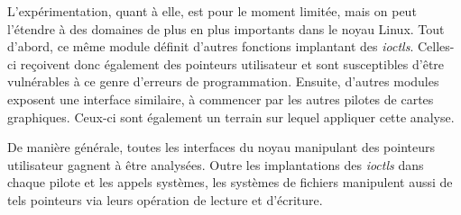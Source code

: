 
L'expérimentation, quant à elle, est pour le moment limitée, mais on peut
l'étendre à des domaines de plus en plus importants dans le noyau Linux. Tout
d'abord, ce même module définit d'autres fonctions implantant des \emph{ioctls}.
Celles-ci reçoivent donc également des pointeurs utilisateur et sont
susceptibles d'être vulnérables à ce genre d'erreurs de programmation. Ensuite,
d'autres modules exposent une interface similaire, à commencer par les autres
pilotes de cartes graphiques. Ceux-ci sont également un terrain sur lequel
appliquer cette analyse.

De manière générale, toutes les interfaces du noyau manipulant des pointeurs
utilisateur gagnent à être analysées. Outre les implantations des \emph{ioctls}
dans chaque pilote et les appels systèmes, les systèmes de fichiers manipulent
aussi de tels pointeurs via leurs opération de lecture et d'écriture.


